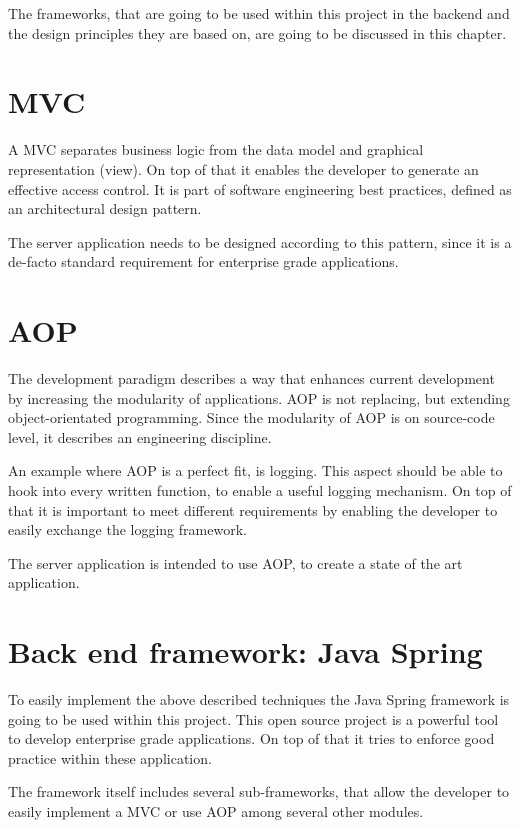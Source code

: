 The frameworks, that are going to be used within this project in the backend and the design principles they are based on, are going to be discussed in this chapter.

\section{\acrfull{MVC}}
A \acrshort{MVC} separates business logic from the data model and graphical representation (view). On top of that it enables the developer to generate an effective access control. It is part of software engineering best practices, defined as an architectural design pattern.

The server application needs to be designed according to this pattern, since it is a de-facto standard requirement for enterprise grade applications.

\section{\acrfull{AOP}}
The development paradigm describes a way that enhances current development by increasing the modularity of applications. \acrshort{AOP} is not replacing, but extending object-orientated programming. Since the modularity of \acrshort{AOP} is on source-code level, it describes an engineering discipline.

An example where \acrlong{AOP} is a perfect fit, is logging. This aspect should be able to hook into every written function, to enable a useful logging mechanism. On top of that it is important to meet different requirements by enabling the developer to easily exchange the logging framework.

The server application is intended to use \acrlong{AOP}, to create a state of the art application.

\section{Back end framework: Java Spring}
To easily implement the above described techniques the Java Spring framework is going to be used within this project. This open source project is a powerful tool to develop enterprise grade applications. On top of that it tries to enforce good practice within these application.

The framework itself includes several sub-frameworks, that allow the developer to easily implement a \acrlong{MVC} or use \acrlong{AOP} among several other modules.

